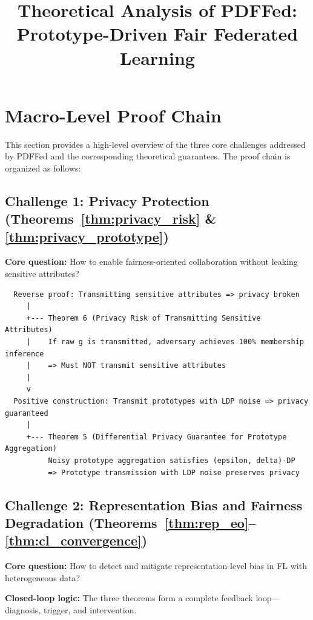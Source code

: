 \documentclass[11pt]{article}
\title{Theoretical Analysis of PDFFed: \\
Prototype-Driven Fair Federated Learning}
\author{}
\date{}
\begin{document}
\maketitle

\section{Macro-Level Proof Chain}
\label{sec:macro_chain}

This section provides a high-level overview of the three core challenges addressed by PDFFed and the corresponding theoretical guarantees. The proof chain is organized as follows:

\subsection{Challenge 1: Privacy Protection (Theorems~\ref{thm:privacy_risk} \& \ref{thm:privacy_prototype})}

\textbf{Core question:} How to enable fairness-oriented collaboration without leaking sensitive attributes?

\begin{verbatim}
  Reverse proof: Transmitting sensitive attributes => privacy broken
     |
     +--- Theorem 6 (Privacy Risk of Transmitting Sensitive Attributes)
     |    If raw g is transmitted, adversary achieves 100% membership inference
     |    => Must NOT transmit sensitive attributes
     |
     v
  Positive construction: Transmit prototypes with LDP noise => privacy guaranteed
     |
     +--- Theorem 5 (Differential Privacy Guarantee for Prototype Aggregation)
          Noisy prototype aggregation satisfies (epsilon, delta)-DP
          => Prototype transmission with LDP noise preserves privacy
\end{verbatim}

\subsection{Challenge 2: Representation Bias and Fairness Degradation (Theorems~\ref{thm:rep_eo}--\ref{thm:cl_convergence})}

\textbf{Core question:} How to detect and mitigate representation-level bias in FL with heterogeneous data?

\textbf{Closed-loop logic:} The three theorems form a complete feedback loop---diagnosis, trigger, and intervention.
\end{document}
